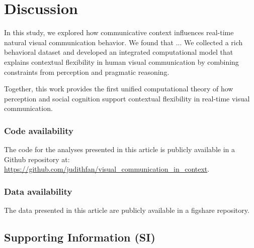 \documentclass[9pt,twocolumn,twoside]{pnas-new}
\begin{document}
\section*{Discussion}

In this study, we explored how communicative context influences real-time natural visual communication behavior. We found that ... We collected a rich behavioral dataset and developed an integrated computational model that explains contextual flexibility in human visual communication by combining constraints from perception and pragmatic reasoning.






Together, this work provides the first unified computational theory of how perception and social cognition support contextual flexibility in real-time visual communication.

\subsubsection*{Code availability} The code for the analyses presented in this article is publicly available in a Github repository at: \url{https://github.com/judithfan/visual_communication_in_context}.

\subsubsection*{Data availability} The data presented in this article are publicly available in a figshare repository.

\subsection*{Supporting Information (SI)}

\end{document}
